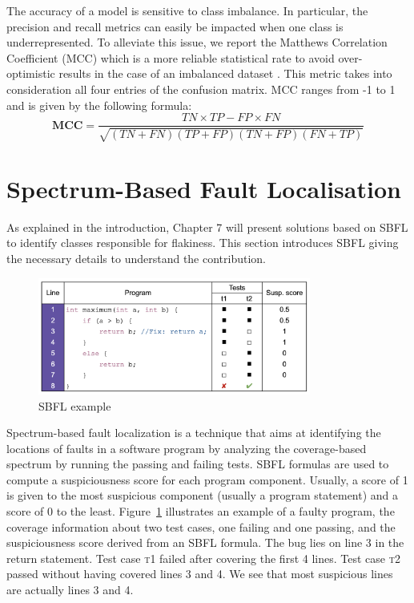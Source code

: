 The accuracy of a model is sensitive to class imbalance. In particular, the precision and recall metrics can easily be impacted when one class is underrepresented. To alleviate this issue, we report the Matthews Correlation Coefficient (MCC) which is a more reliable statistical rate to avoid over-optimistic results in the case of an imbalanced dataset \cite{chicco2020advantages}.
This metric takes into consideration all four entries of the confusion matrix. MCC ranges from -1 to 1 and is given by the following formula: 
    \[
    \textbf{MCC} = \frac{TN \times TP - FP \times FN}{\sqrt{(TN+FN)(TP+FP)(TN+FP)(FN+TP)}}
    \]

\section{Spectrum-Based Fault Localisation}

As explained in the introduction, Chapter 7 will present solutions based on SBFL to identify classes responsible for flakiness. This section introduces SBFL giving the necessary details to understand the contribution.

\begin{figure}[ht]
\centering
\includegraphics[width=0.8\textwidth]{figures/core/sbflExample.png}
\caption{SBFL example}
\label{fig:sbfl}
\end{figure}

Spectrum-based fault localization is a technique that aims at identifying the locations of faults in a software program by analyzing the coverage-based spectrum by running the passing and failing tests. SBFL formulas are used to compute a suspiciousness score for each program component. Usually, a score of 1 is given to the most suspicious component (usually a program statement) and a score of 0 to the least. Figure~\ref{fig:sbfl} illustrates an example of a faulty program, the coverage information about two test cases, one failing and one passing, and the suspiciousness score derived from an SBFL formula. The bug lies on line 3 in the return statement. Test case \textsc{t1} failed after covering the first 4 lines. Test case \textsc{t2} passed without having covered lines 3 and 4. We see that most suspicious lines are actually lines 3 and 4.


